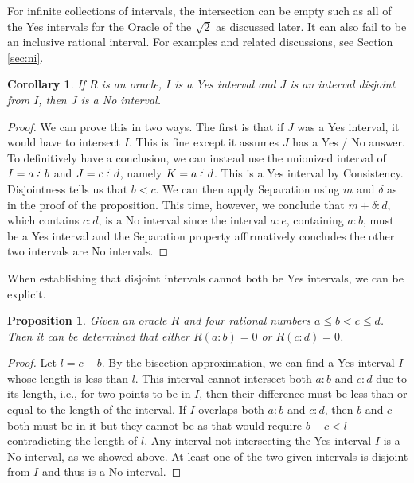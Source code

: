 \documentclass[12pt]{article}
\newtheorem{corollary}{Corollary}[subsection]
\newtheorem{proposition}{Proposition}[subsection]
\begin{document}
For infinite collections of intervals, the intersection can be empty such as all of the Yes intervals for the Oracle of the $\sqrt{2}$ as discussed later. It can also fail to be an inclusive rational interval. For examples and related discussions, see Section \ref{sec:ni}. 

\begin{corollary}
    If $R$ is an oracle, $I$ is a Yes interval and $J$ is an interval disjoint from $I$, then $J$ is a No interval. 
\end{corollary}

\begin{proof}
We can prove this in two ways. The first is that if $J$ was a Yes interval, it would have to intersect $I$. This is fine except it assumes $J$ has a Yes / No answer. To definitively have a conclusion, we can instead use the unionized interval of $I= a\lte b$ and $J = c\lte d$, namely $K = a \lte d$. This is a Yes interval by Consistency. Disjointness tells us that $b < c$. We can then apply Separation using $m$ and $\delta$ as in the proof of the proposition. This time, however, we conclude that $m+\delta:d$, which contains $c:d$, is a No interval since the interval $a:e$, containing $a:b$, must be a Yes interval and the Separation property affirmatively concludes the other two intervals are No intervals. 
\end{proof}


When establishing that disjoint intervals cannot both be Yes intervals, we can be explicit. 

\begin{proposition}
    Given an oracle $R$ and four rational numbers $a \leq b < c \leq d$. Then it can be determined that either $R(a:b) =0$ or $R(c:d) = 0$.
\end{proposition}

\begin{proof}
    Let $l = c-b$. By the bisection approximation, we can find a Yes interval $I$ whose length is less than $l$. This interval cannot intersect both $a:b$ and $c:d$ due to its length, i.e., for two points to be in $I$, then their difference must be less than or equal to the length of the interval. If $I$ overlaps both $a:b$ and $c:d$, then $b$ and $c$ both must be in it but they cannot be as that would require $b-c < l$ contradicting the length of $l$. Any interval not intersecting the Yes interval $I$ is a No interval, as we showed above. At least one of the two given intervals is disjoint from $I$ and thus is a No interval. 
\end{proof}
\end{document}
